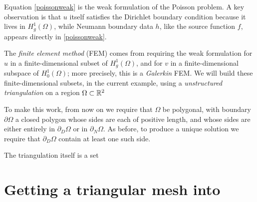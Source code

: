 Equation \eqref{poissonweak} is the weak formulation of the Poisson problem.  A key observation is that $u$ itself satisfies the Dirichlet boundary condition because it lives in $H_g^1(\Omega)$, while Neumann boundary data $h$, like the source function $f$, appears directly in \eqref{poissonweak}.

The \emph{finite element method} (FEM) comes from requiring the weak formulation for $u$ in a finite-dimensional subset of $H_g^1(\Omega)$, and for $v$ in a finite-dimensional subspace of $H_0^1(\Omega)$; more precisely, this is a \emph{Galerkin} FEM.  We will build these finite-dimensional subsets, in the current example, using a \emph{unstructured triangulation} on a region $\Omega\subset \mathbb{R}^2$

To make this work, from now on we require that $\Omega$ be polygonal,
 with boundary $\partial\Omega$ a closed polygon whose sides are each of positive length, and whose sides are either entirely in $\partial_D\Omega$ or in $\partial_N\Omega$.  As before, to produce a unique solution we require that $\partial_D\Omega$ contain at least one such side.

The triangulation itself is a set




\section{Getting a triangular mesh into \PETSc}




